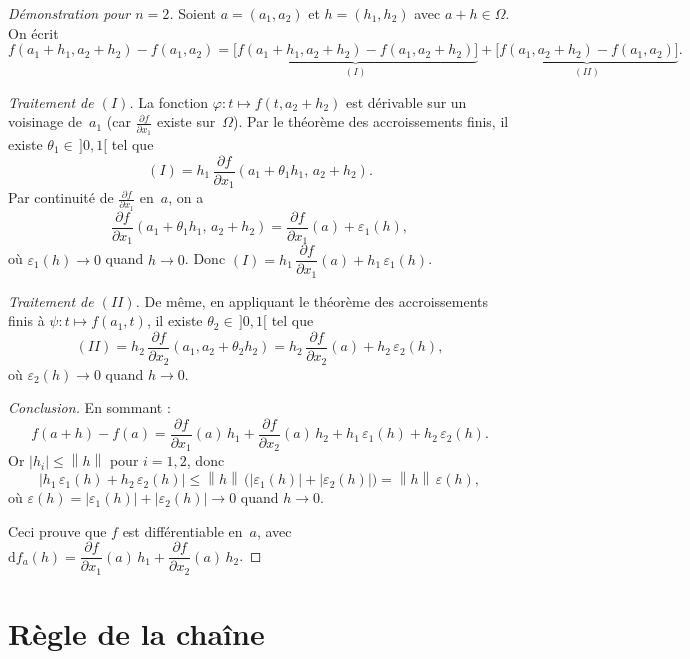 \documentclass[12pt,a4paper,openany]{book}
\theoremstyle{definition}
\newcommand{\eps}{\varepsilon}
\newcommand{\abs}[1]{\left\lvert #1 \right\rvert}
\newcommand{\norm}[1]{\left\lVert #1 \right\rVert}
\newcommand{\dd}{\mathrm{d}}
\begin{document}
\begin{proof}[Démonstration pour $n = 2$]
  Soient $a = (a_1, a_2)$ et $h = (h_1, h_2)$ avec $a + h \in \Omega$. On écrit
  \[
    f(a_1 + h_1, a_2 + h_2) - f(a_1, a_2)
    = \underbrace{\bigl[f(a_1 + h_1, a_2 + h_2) - f(a_1, a_2 + h_2)\bigr]}_{(I)}
    + \underbrace{\bigl[f(a_1, a_2 + h_2) - f(a_1, a_2)\bigr]}_{(II)}.
  \]

  \emph{Traitement de $(I)$.} La fonction $\varphi \colon t \mapsto f(t, a_2 + h_2)$ est dérivable sur un voisinage de~$a_1$ (car $\frac{\partial f}{\partial x_1}$ existe sur~$\Omega$). Par le théorème des accroissements finis, il existe $\theta_1 \in\, ]0,1[$ tel que
  \[
    (I) = h_1 \, \frac{\partial f}{\partial x_1}(a_1 + \theta_1 h_1, \, a_2 + h_2).
  \]
  Par continuité de $\frac{\partial f}{\partial x_1}$ en~$a$, on a
  \[
    \frac{\partial f}{\partial x_1}(a_1 + \theta_1 h_1, \, a_2 + h_2)
    = \frac{\partial f}{\partial x_1}(a) + \eps_1(h),
  \]
  où $\eps_1(h) \to 0$ quand $h \to 0$. Donc $(I) = h_1 \, \dfrac{\partial f}{\partial x_1}(a) + h_1 \, \eps_1(h)$.

  \emph{Traitement de $(II)$.} De même, en appliquant le théorème des accroissements finis à $\psi \colon t \mapsto f(a_1, t)$, il existe $\theta_2 \in\, ]0,1[$ tel que
  \[
    (II) = h_2 \, \frac{\partial f}{\partial x_2}(a_1, a_2 + \theta_2 h_2)
    = h_2 \, \frac{\partial f}{\partial x_2}(a) + h_2 \, \eps_2(h),
  \]
  où $\eps_2(h) \to 0$ quand $h \to 0$.

  \emph{Conclusion.} En sommant :
  \[
    f(a + h) - f(a) = \frac{\partial f}{\partial x_1}(a)\, h_1 + \frac{\partial f}{\partial x_2}(a)\, h_2 + h_1\,\eps_1(h) + h_2\,\eps_2(h).
  \]
  Or $\abs{h_i} \leqslant \norm{h}$ pour $i = 1,2$, donc
  \[
    \abs{h_1\,\eps_1(h) + h_2\,\eps_2(h)} \leqslant \norm{h}\,\bigl(\abs{\eps_1(h)} + \abs{\eps_2(h)}\bigr) = \norm{h}\,\eps(h),
  \]
  où $\eps(h) = \abs{\eps_1(h)} + \abs{\eps_2(h)} \to 0$ quand $h \to 0$.

  Ceci prouve que $f$ est différentiable en~$a$, avec $\dd f_a(h) = \dfrac{\partial f}{\partial x_1}(a)\,h_1 + \dfrac{\partial f}{\partial x_2}(a)\,h_2$.
\end{proof}

\section{Règle de la chaîne}
\label{sec:regle-chaine}
\end{document}
